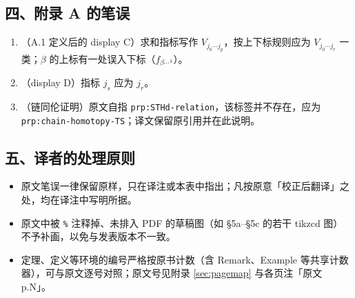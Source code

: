 \documentclass[11pt,a4paper]{article}
\theoremstyle{cnth}
\begin{document}
\subsection*{四、附录 A 的笔误}
\begin{enumerate}[leftmargin=1.6em,itemsep=2pt]
\item （A.1 定义后的 display C）求和指标写作 $V_{j_0\cdots j_p}$，按上下标规则应为 $V_{j_0\cdots j_r}$ 一类；$\beta$ 的上标有一处误入下标（$f_{\beta\cdots^{\,k}}$）。
\item （display D）指标 $j_s$ 应为 $j_r$。
\item （链同伦证明）原文自指 \texttt{prp:STHd-relation}，该标签并不存在，应为 \texttt{prp:chain-homotopy-TS}；译文保留原引用并在此说明。
\end{enumerate}

\subsection*{五、译者的处理原则}
\begin{itemize}[leftmargin=1.6em,itemsep=2pt]
\item 原文笔误一律保留原样，只在译注或本表中指出；凡按原意「校正后翻译」之处，均在译注中写明所据。
\item 原文中被 \texttt{\%} 注释掉、未排入 PDF 的草稿图（如 §5a--§5c 的若干 tikzcd 图）不予补画，以免与发表版本不一致。
\item 定理、定义等环境的编号严格按原书计数（含 Remark、Example 等共享计数器），可与原文逐号对照；原文号见附录 \ref{sec:pagemap} 与各页注「原文 p.N」。
\end{itemize}


\clearpage
{}
{}


\end{document}
